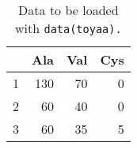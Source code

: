 \begin{table}[ht]
\begin{center}
\begin{tabular}{rrrr}
  \hline
 & Ala & Val & Cys \\
  \hline
1 & 130 & 70 & 0 \\
  2 & 60 & 40 & 0 \\
  3 & 60 & 35 & 5 \\
   \hline
\end{tabular}
\caption{Data to be loaded with \texttt{data(toyaa).}}
\label{toyaa}
\end{center}
\end{table}

